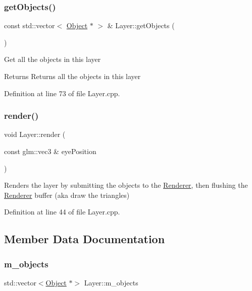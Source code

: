 \subsubsection{\texorpdfstring{get\+Objects()}{getObjects()}}
{\footnotesize\ttfamily const std\+::vector$<$ \hyperlink{class_object}{Object} $\ast$ $>$ \& Layer\+::get\+Objects (\begin{DoxyParamCaption}{ }\end{DoxyParamCaption})}

Get all the objects in this layer \begin{DoxyReturn}{Returns}
Returns all the objects in this layer 
\end{DoxyReturn}


Definition at line 73 of file Layer.\+cpp.

\mbox{\label{class_layer_ad8f9382947a2b1093bf1c8846751bfa2}} 
\subsubsection{\texorpdfstring{render()}{render()}}
{\footnotesize\ttfamily void Layer\+::render (\begin{DoxyParamCaption}\item[{const glm\+::vec3 \&}]{eye\+Position }\end{DoxyParamCaption})}

Renders the layer by submitting the objects to the \hyperlink{class_renderer}{Renderer}, then flushing the \hyperlink{class_renderer}{Renderer} buffer (aka draw the triangles) 

Definition at line 44 of file Layer.\+cpp.



\subsection{Member Data Documentation}
\mbox{\label{class_layer_a5dd19348285314342a7721c000c97179}} 
\subsubsection{\texorpdfstring{m\+\_\+objects}{m\_objects}}
{\footnotesize\ttfamily std\+::vector$<$\hyperlink{class_object}{Object} $\ast$$>$ Layer\+::m\+\_\+objects\hspace{0.3cm}{\ttfamily [protected]}}



